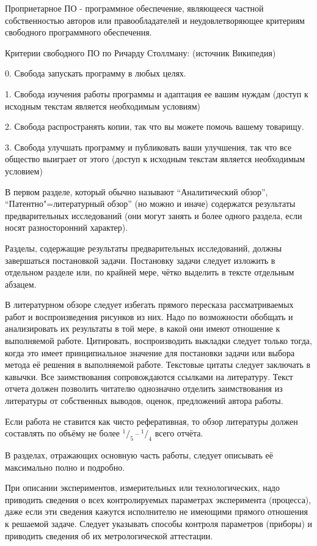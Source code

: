 \documentclass[utf8,12pt, coursreport]{G7-32}
\begin{document}
Проприетарное ПО - программное обеспечение, являющееся частной собственностью авторов или правообладателей и неудовлетворяющее критериям свободного программного обеспечения.

Критерии свободного ПО по Ричарду Столлману: (источник Википедия)

0. Свобода запускать программу в любых целях.

1. Свобода изучения работы программы и адаптация ее вашим нуждам (доступ к исходным текстам является необходимым условиям)

2. Свобода распространять копии, так что вы можете помочь вашему товарищу.

3. Свобода улучшать программу и публиковать ваши улучшения, так что все общество выиграет от этого (доступ к исходным текстам является необходимым условием)

В первом разделе, который обычно называют ``Аналитический обзор'', ``Патентно"=литературный обзор'' (но можно и иначе) содержатся результаты предварительных исследований (они могут занять и более одного раздела, если носят разносторонний характер).

Разделы, содержащие результаты предварительных исследований, должны завершаться постановкой задачи. Постановку задачи следует изложить в отдельном разделе или, по крайней мере, чётко выделить в тексте отдельным абзацем.

В литературном обзоре следует избегать прямого пересказа рассматриваемых работ и воспроизведения рисунков из них. Надо по возможности обобщать и анализировать их результаты в той мере, в какой они имеют отношение к выполняемой работе. Цитировать, воспроизводить выкладки следует только тогда, когда это имеет принципиальное значение для постановки задачи или выбора метода её решения в выполняемой работе. Текстовые цитаты следует заключать в кавычки. Все заимствования сопровождаются ссылками на литературу. Текст отчета должен позволить читателю однозначно отделить заимствования из литературы от собственных выводов, оценок, предложений автора работы.

Если работа не ставится как чисто реферативная, то обзор литературы должен составлять по объёму не более $^1/_5$\,--\,$^1/_4$ всего отчёта.

В разделах, отражающих основную часть работы, следует описывать её максимально полно и подробно.

При описании экспериментов, измерительных или технологических, надо приводить сведения о всех контролируемых параметрах эксперимента (процесса), даже если эти сведения кажутся исполнителю не имеющими прямого отношения к решаемой задаче. Следует указывать способы контроля параметров (приборы) и приводить сведения об их метрологической аттестации.
\end{document}
